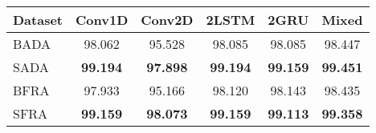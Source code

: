 \begin{tabular}{l|ccccc}\toprule
Dataset & Conv1D & Conv2D & 2LSTM  &  2GRU  & Mixed  \\\midrule
BADA    & 98.062 & 95.528 & 98.085 & 98.085 & 98.447 \\
SADA    & \textbf{99.194} & \textbf{97.898} & \textbf{99.194} & \textbf{99.159} & \textbf{99.451} \\ \midrule
BFRA    & 97.933 & 95.166 & 98.120 & 98.143 & 98.435 \\
SFRA    & \textbf{99.159} & \textbf{98.073} & \textbf{99.159} & \textbf{99.113} & \textbf{99.358} \\\bottomrule
\end{tabular}
